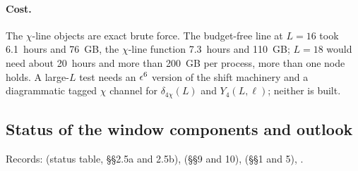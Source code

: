 \paragraph{Cost.} The $\chi$-line objects are exact brute force. The budget-free line at $L=16$ took 6.1~hours and 76~GB, the
$\chi$-line function 7.3~hours and 110~GB; $L=18$ would need about 20~hours and more than 200~GB per process, more than one
node holds. A large-$L$ test needs an $\epsilon^6$ version of the shift machinery and a diagrammatic tagged $\chi$ channel for
$\delta_{4\chi}(L)$ and $Y_4(L,\ell)$; neither is built.

\subsection{Status of the window components and outlook}\label{htp:d2:app:status}
{\small\raggedright\noindent Records:  (status table, \S\S2.5a and 2.5b),
 (\S\S9 and 10),  (\S\S1 and 5),
.\par}

